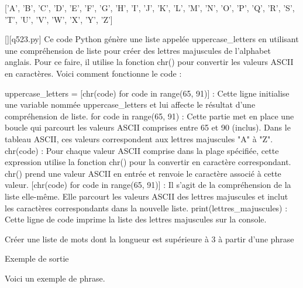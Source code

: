 ['A', 'B', 'C', 'D', 'E', 'F', 'G', 'H', 'I', 'J', 'K', 'L', 'M', 'N', 'O', 'P', 'Q', 'R', 'S', 'T', 'U', 'V', 'W', 'X', 'Y', 'Z']
        \par
        \begin{solution}
            \renewcommand{\nomfichier}{q523.py}
            \pythonfile{\chemincode \nomfichier}[][\nomfichier]
            Ce code Python génère une liste appelée uppercase_letters en utilisant une compréhension de liste pour créer des lettres majuscules de l'alphabet anglais. Pour ce faire, il utilise la fonction chr() pour convertir les valeurs ASCII en caractères. Voici comment fonctionne le code :

    uppercase_letters = [chr(code) for code in range(65, 91)] : Cette ligne initialise une variable nommée uppercase_letters et lui affecte le résultat d'une compréhension de liste.
        for code in range(65, 91) : Cette partie met en place une boucle qui parcourt les valeurs ASCII comprises entre 65 et 90 (inclus). Dans le tableau ASCII, ces valeurs correspondent aux lettres majuscules "A" à "Z".
        chr(code) : Pour chaque valeur ASCII comprise dans la plage spécifiée, cette expression utilise la fonction chr() pour la convertir en caractère correspondant. chr() prend une valeur ASCII en entrée et renvoie le caractère associé à cette valeur.
        [chr(code) for code in range(65, 91)] : Il s'agit de la compréhension de la liste elle-même. Elle parcourt les valeurs ASCII des lettres majuscules et inclut les caractères correspondants dans la nouvelle liste.
    print(lettres_majuscules) : Cette ligne de code imprime la liste des lettres majuscules sur la console.
        \end{solution}
        

        \question
        Créer une liste de mots dont la longueur est supérieure à 3 à partir d'une phrase

Exemple de sortie

Voici un exemple de phrase.

